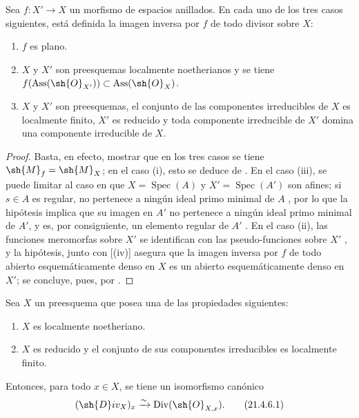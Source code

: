 \begin{proposition}[21.4.5]
\label{IV.21.4.5}
Sea $f:X'\to X$ un morfismo de espacios anillados.
En cada uno de los tres casos siguientes, está definida la imagen inversa por $f$ de todo divisor sobre $X$:
\begin{enumerate}[label=\textup{(\roman*)}]
  \item $f$ es plano.
  \item $X$ y $X'$ son preesquemas localmente noetherianos y se tiene $f(\operatorname{Ass}(\sh{O}_{X'}))\subset\operatorname{Ass}(\sh{O}_X)$.
  \item $X$ y $X'$ son preesquemas, el conjunto de las componentes irreducibles de $X$ es localmente finito, $X'$ es reducido y toda componente irreducible de $X'$ domina una componente irreducible de $X$.
\end{enumerate}
\end{proposition}

\begin{proof}
Basta, en efecto, mostrar que en los tres casos se tiene $\sh{M}_f=\sh{M}_X$;
en el caso (i), esto se deduce de .
En el caso (iii), se puede limitar al caso en que $X=\operatorname{Spec}(A)$ y $X'=\operatorname{Spec}(A')$ son afines;
si $s\in A$ es regular, no pertenece a ningún ideal primo minimal de $A$ , por lo que la hipótesis implica que su imagen en $A'$ no pertenece a ningún ideal primo minimal de $A'$, y es, por consiguiente, un elemento regular de $A'$ .
En el caso (ii), las funciones meromorfas sobre $X'$ se identifican con las pseudo-funciones sobre $X'$ , y la hipótesis, junto con [(iv)] asegura que la imagen inversa
por $f$ de todo abierto esquemáticamente denso en $X$ es un abierto esquemáticamente denso en $X'$;
se concluye, pues, por .
\end{proof}

\begin{corollary}[21.4.6]
\label{IV.21.4.6}
Sea $X$ un preesquema que posea una de las propiedades siguientes:
\begin{enumerate}[label=\textup{(\roman*)}]
  \item $X$ es localmente noetheriano.
  \item $X$ es reducido y el conjunto de sus componentes irreducibles es localmente finito.
\end{enumerate}
Entonces, para todo $x\in X$, se tiene un isomorfismo canónico
\[
\label{IV.21.4.6.1}
  (\sh{D}iv_X)_x\xrightarrow{\sim}\operatorname{Div}(\sh{O}_{X,x}).
  \tag{21.4.6.1}
\]
\end{corollary}


